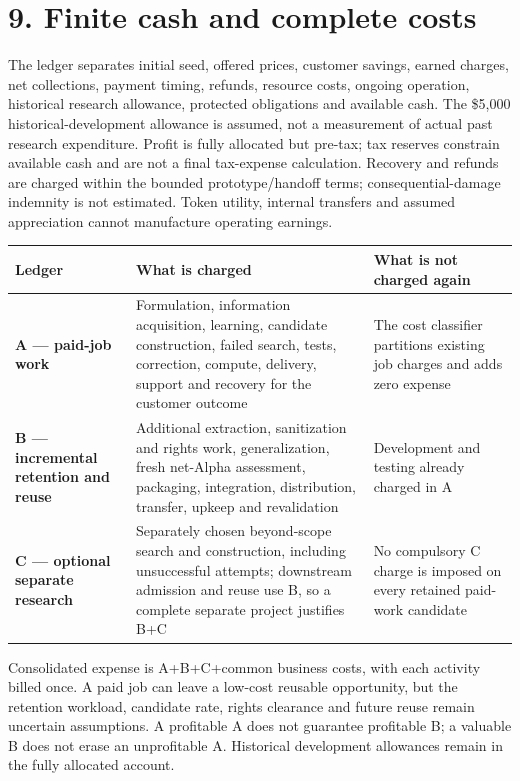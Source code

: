 \documentclass[
  10pt,
]{article}
\let\studysection\section
\renewcommand{\section}{\Needspace{7\baselineskip}\studysection}
\begin{document}
\hypertarget{9-finite-cash-and-complete-costs}{%
\section{9. Finite cash and complete
costs}\label{9-finite-cash-and-complete-costs}}

The ledger separates initial seed, offered prices, customer savings,
earned charges, net collections, payment timing, refunds, resource
costs, ongoing operation, historical research allowance, protected
obligations and available cash. The \$5,000 historical-development
allowance is assumed, not a measurement of actual past research
expenditure. Profit is fully allocated but pre-tax; tax reserves
constrain available cash and are not a final tax-expense calculation.
Recovery and refunds are charged within the bounded prototype/handoff
terms; consequential-damage indemnity is not estimated. Token utility,
internal transfers and assumed appreciation cannot manufacture operating
earnings.

\begin{longtable}[]{@{}>{\raggedright\arraybackslash}p{.22\linewidth}>{\raggedright\arraybackslash}p{.37\linewidth}>{\raggedright\arraybackslash}p{.35\linewidth}@{}}
\toprule\noalign{}
Ledger & What is charged & What is not charged again \\
\midrule\noalign{}
\endhead
\bottomrule\noalign{}
\endlastfoot
\textbf{A --- paid-job work} & Formulation, information acquisition,
learning, candidate construction, failed search, tests, correction,
compute, delivery, support and recovery for the customer outcome & The
cost classifier partitions existing job charges and adds zero expense \\
\textbf{B --- incremental retention and reuse} & Additional extraction,
sanitization and rights work, generalization, fresh net-Alpha
assessment, packaging, integration, distribution, transfer, upkeep and
revalidation & Development and testing already charged in A \\
\textbf{C --- optional separate research} & Separately chosen
beyond-scope search and construction, including unsuccessful attempts;
downstream admission and reuse use B, so a complete separate project
justifies B+C & No compulsory C charge is imposed on every retained
paid-work candidate \\
\end{longtable}

Consolidated expense is A+B+C+common business costs, with each activity
billed once. A paid job can leave a low-cost reusable opportunity, but
the retention workload, candidate rate, rights clearance and future
reuse remain uncertain assumptions. A profitable A does not guarantee
profitable B; a valuable B does not erase an unprofitable A. Historical
development allowances remain in the fully allocated account.
\end{document}
